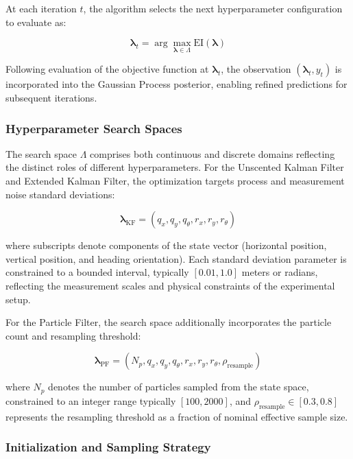\documentclass[conference]{IEEEtran}
\begin{document}
At each iteration $t$, the algorithm selects the next hyperparameter configuration to evaluate as:

\begin{equation}
    \boldsymbol{\lambda}_t = \arg\max_{\boldsymbol{\lambda} \in \Lambda} \text{EI}(\boldsymbol{\lambda})
\end{equation}

Following evaluation of the objective function at $\boldsymbol{\lambda}_t$, the observation $(\boldsymbol{\lambda}_t, y_t)$ is incorporated into the Gaussian Process posterior, enabling refined predictions for subsequent iterations.

\subsubsection{Hyperparameter Search Spaces}

The search space $\Lambda$ comprises both continuous and discrete domains reflecting the distinct roles of different hyperparameters. For the Unscented Kalman Filter and Extended Kalman Filter, the optimization targets process and measurement noise standard deviations:

\begin{equation}
    \boldsymbol{\lambda}_{\text{KF}} = (q_x, q_y, q_\theta, r_x, r_y, r_\theta)
\end{equation}

where subscripts denote components of the state vector (horizontal position, vertical position, and heading orientation). Each standard deviation parameter is constrained to a bounded interval, typically $[0.01, 1.0]$ meters or radians, reflecting the measurement scales and physical constraints of the experimental setup.

For the Particle Filter, the search space additionally incorporates the particle count and resampling threshold:

\begin{equation}
    \boldsymbol{\lambda}_{\text{PF}} = (N_p, q_x, q_y, q_\theta, r_x, r_y, r_\theta, \rho_{\text{resample}})
\end{equation}

where $N_p$ denotes the number of particles sampled from the state space, constrained to an integer range typically $[100, 2000]$, and $\rho_{\text{resample}} \in [0.3, 0.8]$ represents the resampling threshold as a fraction of nominal effective sample size.

\subsubsection{Initialization and Sampling Strategy}
\end{document}
